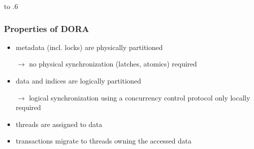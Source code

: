 \begin{frame}
	\vbox to .6
\end{frame}

\begin{frame}
	\frametitle{Properties of DORA}
	
	\begin{itemize}
		\item	metadata (incl. locks) are physically partitioned
		\item[$\rightarrow$]	no physical synchronization (latches, atomics) required
		\item	data and indices are logically partitioned
		\item[$\rightarrow$]	logical synchronization using a concurrency control protocol only locally required
		\item	threads are assigned to data
		\item	transactions migrate to threads owning the accessed data
	\end{itemize}
\end{frame}


